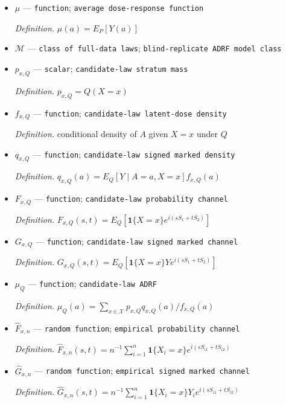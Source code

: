 \documentclass{article}
\begin{document}
\begin{itemize}
  \item \(\mu\) --- \texttt{function}; \texttt{average dose-\allowbreak{}response function}
  \par\smallskip\noindent\emph{Definition.} \(\mu(a)=E_P[Y(a)]\)
  \item \(\mathcal M\) --- \texttt{class of full-\allowbreak{}data laws}; \texttt{blind-\allowbreak{}replicate ADRF model class}
  \item \(p_{x,Q}\) --- \texttt{scalar}; \texttt{candidate-\allowbreak{}law stratum mass}
  \par\smallskip\noindent\emph{Definition.} \(p_{x,Q}=Q(X=x)\)
  \item \(f_{x,Q}\) --- \texttt{function}; \texttt{candidate-\allowbreak{}law latent-\allowbreak{}dose density}
  \par\smallskip\noindent\emph{Definition.} conditional density of \(A\) given \(X=x\) under \(Q\)
  \item \(q_{x,Q}\) --- \texttt{function}; \texttt{candidate-\allowbreak{}law signed marked density}
  \par\smallskip\noindent\emph{Definition.} \(q_{x,Q}(a)=E_Q[Y\mid A=a,X=x]f_{x,Q}(a)\)
  \item \(F_{x,Q}\) --- \texttt{function}; \texttt{candidate-\allowbreak{}law probability channel}
  \par\smallskip\noindent\emph{Definition.} \(F_{x,Q}(s,t)=E_Q[\mathbf 1\{X=x\}e^{i(sS_1+tS_2)}]\)
  \item \(G_{x,Q}\) --- \texttt{function}; \texttt{candidate-\allowbreak{}law signed marked channel}
  \par\smallskip\noindent\emph{Definition.} \(G_{x,Q}(s,t)=E_Q[\mathbf 1\{X=x\}Ye^{i(sS_1+tS_2)}]\)
  \item \(\mu_Q\) --- \texttt{function}; \texttt{candidate-\allowbreak{}law ADRF}
  \par\smallskip\noindent\emph{Definition.} \(\mu_Q(a)=\sum_{x\in\mathcal X}p_{x,Q}q_{x,Q}(a)/f_{x,Q}(a)\)
  \item \(\widehat F_{x,n}\) --- \texttt{random function}; \texttt{empirical probability channel}
  \par\smallskip\noindent\emph{Definition.} \(\widehat F_{x,n}(s,t)=n^{-1}\sum_{i=1}^n\mathbf 1\{X_i=x\}e^{i(sS_{i1}+tS_{i2})}\)
  \item \(\widehat G_{x,n}\) --- \texttt{random function}; \texttt{empirical signed marked channel}
  \par\smallskip\noindent\emph{Definition.} \(\widehat G_{x,n}(s,t)=n^{-1}\sum_{i=1}^n\mathbf 1\{X_i=x\}Y_i e^{i(sS_{i1}+tS_{i2})}\)

\end{itemize}
\end{document}
